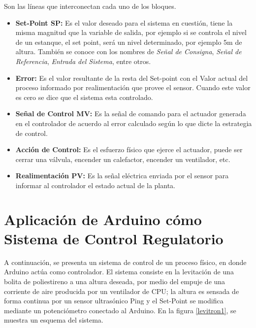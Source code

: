 \documentclass[letterpaper, 10pt]{report}
\begin{document}
	Son las líneas que interconectan cada uno de los bloques.
	\begin{itemize}
	\item {\bf Set-Point SP: }
 Es el valor deseado para el sistema en cuestión, tiene la misma magnitud que la variable de salida, por ejemplo si se controla el nivel de un estanque, el set point, será un nivel determinado, por ejemplo 5m de altura. También se conoce con los nombres de \emph{Señal de Consigna}, \emph{Señal de Referencia}, \emph{Entrada del Sistema}, entre otros.
	
	\item {\bf Error: }
 Es el valor resultante de la resta del Set-point con el Valor actual del proceso informado por realimentación que provee el sensor. Cuando este valor es cero se dice que el sistema esta controlado.
	
	\item {\bf Señal de Control MV: }
 Es la señal de comando para el actuador  generada en el controlador de acuerdo al error calculado según lo que dicte la estrategia de control.
	
	\item {\bf Acción de Control: }
 Es el esfuerzo físico que ejerce el actuador, puede ser cerrar una válvula, encender un calefactor, encender un ventilador, etc.
 
	
	\item {\bf Realimentación PV:} Es la señal eléctrica enviada por el sensor para informar al controlador el estado actual de la planta.
\end{itemize}

\section{Aplicación de Arduino cómo Sistema de Control Regulatorio}

A continuación, se presenta un sistema de control de un proceso físico, en donde Arduino actúa como controlador. El sistema consiste en la levitación de una bolita de poliestireno a una altura deseada, por medio del empuje de una corriente de aire producida por un ventilador de CPU; la altura es sensada de forma continua por un sensor ultrasónico Ping y el Set-Point se modifica mediante un potenciómetro conectado al Arduino. En la figura \ref{levitron1}, se muestra un esquema del sistema. 
\end{document}
